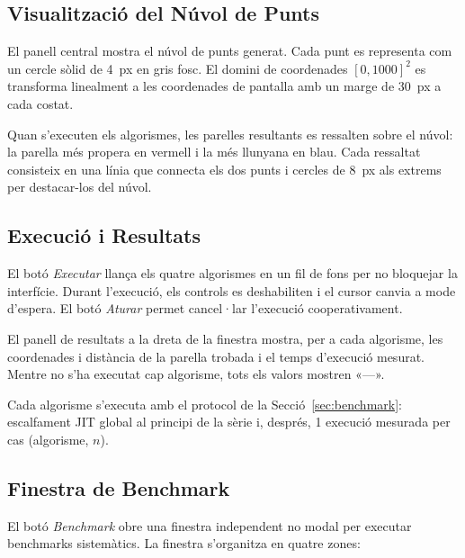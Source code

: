 \documentclass[conference,compsoc]{IEEEtran}
\begin{document}
\subsection{Visualització del Núvol de Punts}

El panell central mostra el núvol de punts generat. Cada punt es
representa com un cercle sòlid de 4~px en gris fosc. El domini de
coordenades $[0, 1000]^2$ es transforma linealment a les coordenades
de pantalla amb un marge de 30~px a cada costat.

Quan s'executen els algorismes, les parelles resultants es ressalten
sobre el núvol: la parella més propera en vermell i la més llunyana
en blau. Cada ressaltat consisteix en una línia que connecta els dos
punts i cercles de 8~px als extrems per destacar-los del núvol.


\subsection{Execució i Resultats}

El botó \textit{Executar} llança els quatre algorismes en un fil
de fons per no bloquejar la interfície. Durant l'execució, els controls
es deshabiliten i el cursor canvia a mode d'espera. El botó
\textit{Aturar} permet cancel·lar l'execució cooperativament.

El panell de resultats a la dreta de la finestra mostra, per a cada
algorisme, les coordenades i distància de la parella trobada i el
temps d'execució mesurat. Mentre no s'ha executat cap algorisme, tots
els valors mostren «---».

Cada algorisme s'executa amb el protocol de la Secció~\ref{sec:benchmark}:
escalfament JIT global al principi de la sèrie i, després, 1 execució
mesurada per cas (algorisme, $n$).


\subsection{Finestra de Benchmark}

El botó \textit{Benchmark} obre una finestra independent no modal per
executar benchmarks sistemàtics. La finestra s'organitza en quatre zones:
\end{document}
